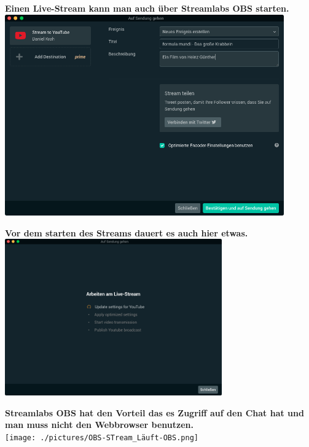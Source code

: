 \newpage
\begin{center}
  \textbf{Einen Live-Stream kann man auch über Streamlabs OBS starten.} \\
  {\vspace{0.3cm}}
  \includegraphics[width=0.9\textwidth]{./pictures/OBSSTUDIO_schnell_aufSendung.png}
\end{center}

\begin{center}
  \textbf{Vor dem starten des Streams dauert es auch hier etwas.} \\
  {\vspace{0.3cm}}
  \includegraphics[width=0.7\textwidth]{./pictures/obsStudioIsStartingStream.png}
\end{center}

\newpage
\begin{center}
  \textbf{Streamlabs OBS hat den Vorteil das es Zugriff auf den Chat hat und man muss nicht den Webbrowser benutzen.} \\
  {\vspace{0.3cm}}
  \texttt{[image: ./pictures/OBS-STream\_Läuft-OBS.png]}
\end{center}

